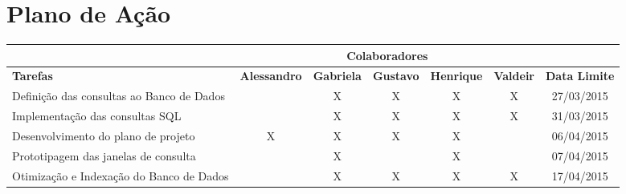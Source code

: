 \documentclass[a4paper,12pt]{article}
\begin{document}
{\newpage
\section{Plano de Ação}

\begin{longtable}{|p{3cm}|c|c|c|c|c|c|}


\hline
& \multicolumn{5}{c|}{\textbf{Colaboradores}}                                                                                                                                                                   & \multicolumn{1}{l|}{}                     \\ \hline
\textbf{Tarefas}                          & \multicolumn{1}{l|}{\textbf{Alessandro}} & \multicolumn{1}{l|}{\textbf{Gabriela}} & \multicolumn{1}{l|}{\textbf{Gustavo}} & \multicolumn{1}{l|}{\textbf{Henrique}} & \multicolumn{1}{l|}{\textbf{Valdeir}} & \multicolumn{1}{l|}{\textbf{Data Limite}} \\ \hline
Definição das consultas ao Banco de Dados &                                          & X                                      & X                                     & X                                      & X                                     & 27/03/2015                                \\ \hline
Implementação das consultas SQL           &                                          & X                                      & X                                     & X                                      & X                                     & 31/03/2015                                \\ \hline
Desenvolvimento do plano de projeto       & X                                        & X                                      & X                                     & X                                      &                                       & 06/04/2015                                \\ \hline
Prototipagem das janelas de consulta      &                                          & X                                      &                                       & X                                      &                                       & 07/04/2015                                \\ \hline
Otimização e Indexação do Banco de Dados    &                                          & X                                      & X                                     & X                                      & X                                     & 17/04/2015                                \\ \hline

\end{longtable}}
\end{document}
